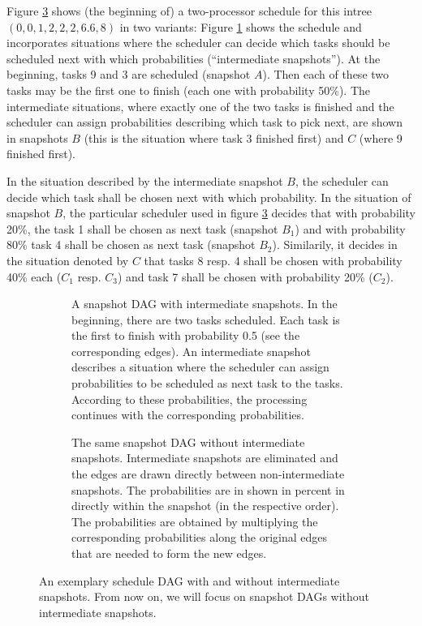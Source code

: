 Figure \ref{fig:schedule-dag-intro} shows (the beginning of) a two-processor schedule for this intree $(0,0,1,2,2,2,6.6,8)$ in two variants: Figure \ref{fig:schedule-dag-intro-intermediates} shows the schedule and incorporates situations where the scheduler can decide which tasks should be scheduled next with which probabilities (``intermediate snapshots''). At the beginning, tasks 9 and 3 are scheduled (snapshot $A$). Then each of these two tasks may be the first one to finish (each one with probability 50\%). The intermediate situations, where exactly one of the two tasks is finished and the scheduler can assign probabilities describing which task to pick next, are shown in snapshots $B$ (this is the situation where task 3 finished first) and $C$ (where 9 finished first).

In the situation described by the intermediate snapshot $B$, the scheduler can decide which task shall be chosen next with which probability. In the situation of snapshot $B$, the particular scheduler used in figure \ref{fig:schedule-dag-intro} decides that with probability 20\%, the task 1 shall be chosen as next task (snapshot $B_1$) and with probability 80\% task 4 shall be chosen as next task (snapshot $B_2$). Similarily, it decides in the situation denoted by $C$ that tasks 8 resp. 4 shall be chosen with probability 40\% each ($C_1$ resp. $C_3$) and task 7 shall be chosen with probability 20\% ($C_2$).

\begin{figure}[th]
  \centering
  \begin{subfigure}{\textwidth}
    \centering
    
    \caption{A snapshot DAG with intermediate snapshots. In the beginning, there are two tasks scheduled. Each task is the first to finish with probability 0.5 (see the corresponding edges). An intermediate snapshot describes a situation where the scheduler can assign probabilities to be scheduled as next task to the tasks. According to these probabilities, the processing continues with the corresponding probabilities.}
  \label{fig:schedule-dag-intro-intermediates}
  \end{subfigure}
  \begin{subfigure}{\textwidth}
    \centering
    
    \caption{The same snapshot DAG without intermediate snapshots. Intermediate snapshots are eliminated and the edges are drawn directly between non-intermediate snapshots. The probabilities are in shown in percent in directly within the snapshot (in the respective order). The probabilities are obtained by multiplying the corresponding probabilities along the original edges that are needed to form the new edges.}
  \label{fig:schedule-dag-intro-no-intermediates}
  \end{subfigure}
  \caption{An exemplary schedule DAG with and without intermediate snapshots. From now on, we will focus on snapshot DAGs without intermediate snapshots.}
  \label{fig:schedule-dag-intro}
\end{figure}

